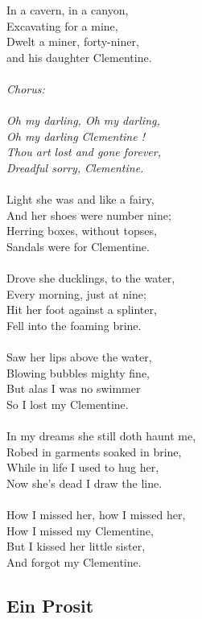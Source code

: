 \documentclass[a5paper]{article}
\begin{document}
In a cavern, in a canyon,\\
Excavating for a mine,\\
Dwelt a miner, forty-niner, \\
and his daughter Clementine.\\
\\
\textit{Chorus:\\
\\
Oh my darling, Oh my darling, \\
Oh my darling Clementine ! \\
Thou art lost and gone forever, \\
Dreadful sorry, Clementine.}\\
\\
Light she was and like a fairy, \\
And her shoes were number nine; \\
Herring boxes, without topses, \\
Sandals were for Clementine.\\
\\
Drove she ducklings, to the water,\\
Every morning, just at nine;  \\
Hit her foot against a splinter,  \\
Fell into the foaming brine.\\
\\
Saw her lips above the water, \\
Blowing bubbles mighty fine, \\
But alas I was no swimmer \\
So I lost my Clementine.\\
\\
In my dreams she still doth haunt me, \\
Robed in garments soaked in brine, \\
While in life I used to hug her, \\
Now she's dead I draw the line.\\
\\
How I missed her, how I missed her, \\
How I missed my Clementine, \\
But I kissed her little sister, \\
And forgot my Clementine.\\

\newpage

\subsection{Ein Prosit} %
\label{sub:ein_prosit}
\end{document}
